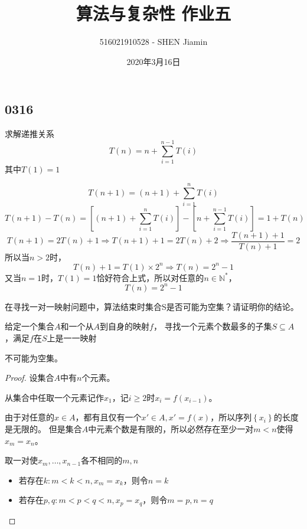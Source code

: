 \documentclass[answers]{exam}
\title{算法与复杂性 \quad 作业五}
\author{516021910528 - SHEN Jiamin}
\date{2020年3月16日}
\begin{document}
\maketitle

\begin{questions}

    \section{0316}

    \question 求解递推关系$$T(n) = n + \sum_{i=1}^{n-1}{T(i)}$$其中$T(1)=1$
    \begin{solution}
        $$
            T(n+1) = (n+1) + \sum_{i=1}^{n}{T(i)}
        $$
        $$
            T(n+1) - T(n)  = \left[(n+1) + \sum_{i=1}^{n}{T(i)}\right] - \left[n + \sum_{i=1}^{n-1}{T(i)}\right]
            = 1 + T(n)
        $$
        $$
            T(n+1) = 2T(n) + 1 \Rightarrow
            T(n+1) + 1 = 2T(n) + 2 \Rightarrow
            \frac{T(n+1) + 1}{T(n) + 1} = 2
        $$
        所以当$n>2$时，
        $$
            T(n) + 1 = T(1) \times 2^n \Rightarrow
            T(n) = 2^n - 1
        $$
        又当$n=1$时，$T(1) = 1$恰好符合上式，所以对任意的$n \in \mathbb{N}^*$，
        $$
            T(n) = 2^n - 1
        $$
    \end{solution}

    \newpage %

    \question 在寻找一对一映射问题中，算法结束时集合S是否可能为空集？请证明你的结论。

    {\kaishu
    给定一个集合$A$和一个从$A$到自身的映射$f$，
    寻找一个元素个数最多的子集$S \subseteq A$，满足$f$在$S$上是一一映射
    }

    \begin{solution}
        不可能为空集。

        \begin{proof}
            设集合$A$中有$n$个元素。

            从集合中任取一个元素记作$x_1$，记$i \geq 2$时$x_{i} = f(x_{i-1})$。

            由于对任意的$x \in A$，都有且仅有一个$x' \in A, x' = f(x)$，所以序列$\left\{x_i\right\}$的长度是无限的。
            但是集合$A$中元素个数是有限的，所以必然存在至少一对$m < n$使得$x_m = x_n$。

            取一对使$x_m, \dots, x_{n-1}$各不相同的$m,n$
            \begin{itemize}
                \item 若存在$k:m < k < n , x_m = x_k$，则令$n = k$
                \item 若存在$p,q:m < p < q < n , x_p = x_q$，则令$m = p, n = q$
            \end{itemize}


\end{proof}
\end{solution}
\end{questions}
\end{document}
